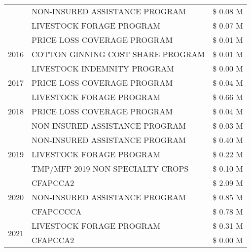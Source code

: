 \begin{tabular}{llr}
 & NON-INSURED ASSISTANCE PROGRAM & \$ 0.08 M \\
 & LIVESTOCK FORAGE PROGRAM & \$ 0.07 M \\
\cline{1-3}
\multirow[t]{3}{*}{2016} & PRICE LOSS COVERAGE PROGRAM & \$ 0.01 M \\
 & COTTON GINNING COST SHARE PROGRAM & \$ 0.01 M \\
 & LIVESTOCK INDEMNITY PROGRAM & \$ 0.00 M \\
\cline{1-3}
2017 & PRICE LOSS COVERAGE PROGRAM & \$ 0.04 M \\
\cline{1-3}
\multirow[t]{3}{*}{2018} & LIVESTOCK FORAGE PROGRAM & \$ 0.66 M \\
 & PRICE LOSS COVERAGE PROGRAM & \$ 0.04 M \\
 & NON-INSURED ASSISTANCE PROGRAM & \$ 0.03 M \\
\cline{1-3}
\multirow[t]{3}{*}{2019} & NON-INSURED ASSISTANCE PROGRAM & \$ 0.40 M \\
 & LIVESTOCK FORAGE PROGRAM & \$ 0.22 M \\
 & TMP/MFP 2019 NON SPECIALTY CROPS & \$ 0.10 M \\
\cline{1-3}
\multirow[t]{3}{*}{2020} & CFAPCCA2 & \$ 2.09 M \\
 & NON-INSURED ASSISTANCE PROGRAM & \$ 0.85 M \\
 & CFAPCCCCA & \$ 0.78 M \\
\cline{1-3}
\multirow[t]{2}{*}{2021} & LIVESTOCK FORAGE PROGRAM & \$ 0.31 M \\
 & CFAPCCA2 & \$ 0.00 M \\
\cline{1-3}
\bottomrule
\end{tabular}
